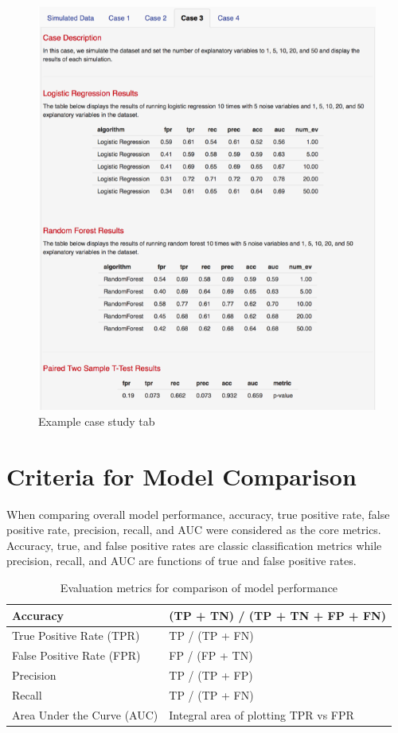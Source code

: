 \documentclass{llncs}
\begin{document}
\begin{figure}
\centering
\includegraphics[scale=0.99]{center.png}
\caption{Example case study tab}
\label{fig:center}
\end{figure}


\section{Criteria for Model Comparison}
\noindent 
When comparing overall model performance, accuracy, true positive rate, false positive rate, precision, recall, and AUC were considered as the core metrics. Accuracy, true, and false positive rates are classic classification metrics while precision, recall, and AUC are functions of true and false positive rates.

\begin{table}[]
\centering
\begin{tabular}{|l|l|}
\hline
Accuracy                   & (TP + TN) / (TP + TN + FP + FN)      \\ \hline
True Positive Rate (TPR)   & TP / (TP + FN)                       \\ \hline
False Positive Rate (FPR)  & FP / (FP + TN)                       \\ \hline
Precision                  & TP / (TP + FP)                       \\ \hline
Recall                     & TP / (TP + FN)                       \\ \hline
Area Under the Curve (AUC) & Integral area of plotting TPR vs FPR \\ \hline
\end{tabular}
\caption{Evaluation metrics for comparison of model performance}
\label{eval_metrics}
\end{table}
\end{document}
